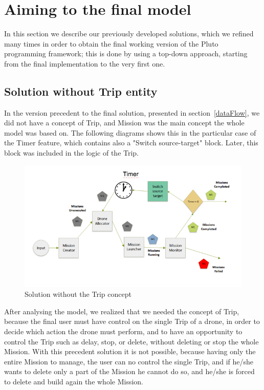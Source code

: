 \section{Aiming to the final model}

In this section we describe our previously developed solutions, which we refined many times in order to obtain the final working version of the Pluto programming framework; this is done by using a top-down approach, starting from the final implementation to the very first one.

\subsection{Solution without Trip entity}

In the version precedent to the final solution, presented in section~\ref{dataFlow}, we did not have a concept of Trip, and Mission was the main concept the whole model was based on. The following diagrams shows this in the particular case of the Timer feature, which contains also a "Switch source-target" block. Later, this block was included in the logic of the Trip.

\begin{figure}[htb]
  \centering
  \includegraphics[width=\linewidth]{pictures/NoTrip.png}
  \caption{Solution without the Trip concept}
  \label{fig:noTrip}
\end{figure}

After analysing the model, we realized that we needed the concept of Trip, because the final user must have control on the single Trip of a drone, in order to decide which action the drone must perform, and to have an opportunity to control the Trip such as delay, stop, or delete, without deleting or stop the whole Mission. With this precedent solution it is not possible, because having only the entire  Mission to manage, the user can no control the single Trip, and if he/she wants to delete only a part of the Mission he cannot do so, and he/she is forced to delete and build again the whole Mission.

